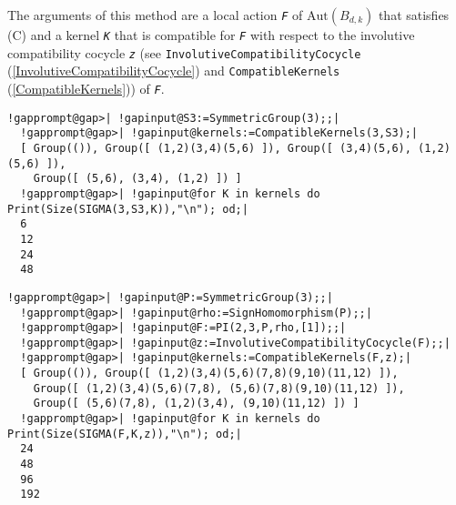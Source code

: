 \documentclass[a4paper,11pt]{report}
\begin{document}
{{{\begin{description}
 The arguments of this method are a local action \mbox{\texttt{\mdseries\slshape F}} of $\mathrm{Aut}(B_{d,k})$ that satisfies (C) and a kernel \mbox{\texttt{\mdseries\slshape K}} that is compatible for \mbox{\texttt{\mdseries\slshape F}} with respect to the involutive compatibility cocycle \mbox{\texttt{\mdseries\slshape z}} (see \texttt{InvolutiveCompatibilityCocycle} (\ref{InvolutiveCompatibilityCocycle}) and \texttt{CompatibleKernels} (\ref{CompatibleKernels})) of \mbox{\texttt{\mdseries\slshape F}}. 
\end{description}
 

 }

 

 
\begin{Verbatim}[commandchars=!@|,fontsize=\small,frame=single,label=Example]
  !gapprompt@gap>| !gapinput@S3:=SymmetricGroup(3);;|
  !gapprompt@gap>| !gapinput@kernels:=CompatibleKernels(3,S3);|
  [ Group(()), Group([ (1,2)(3,4)(5,6) ]), Group([ (3,4)(5,6), (1,2)(5,6) ]), 
    Group([ (5,6), (3,4), (1,2) ]) ]
  !gapprompt@gap>| !gapinput@for K in kernels do Print(Size(SIGMA(3,S3,K)),"\n"); od;|
  6
  12
  24
  48
\end{Verbatim}
 

 
\begin{Verbatim}[commandchars=!@|,fontsize=\small,frame=single,label=Example]
  !gapprompt@gap>| !gapinput@P:=SymmetricGroup(3);;|
  !gapprompt@gap>| !gapinput@rho:=SignHomomorphism(P);;|
  !gapprompt@gap>| !gapinput@F:=PI(2,3,P,rho,[1]);;|
  !gapprompt@gap>| !gapinput@z:=InvolutiveCompatibilityCocycle(F);;|
  !gapprompt@gap>| !gapinput@kernels:=CompatibleKernels(F,z);|
  [ Group(()), Group([ (1,2)(3,4)(5,6)(7,8)(9,10)(11,12) ]), 
    Group([ (1,2)(3,4)(5,6)(7,8), (5,6)(7,8)(9,10)(11,12) ]), 
    Group([ (5,6)(7,8), (1,2)(3,4), (9,10)(11,12) ]) ]
  !gapprompt@gap>| !gapinput@for K in kernels do Print(Size(SIGMA(F,K,z)),"\n"); od;|
  24
  48
  96
  192
\end{Verbatim}
 }

 }

   
\end{document}

